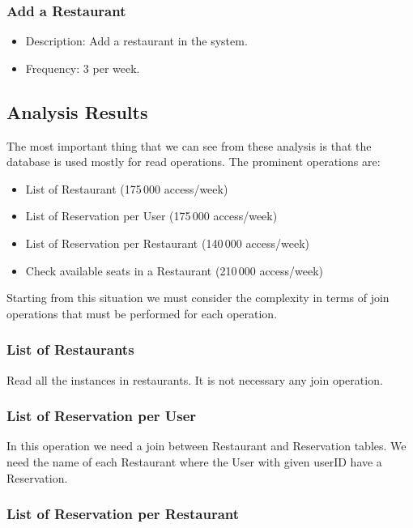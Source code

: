 \subsubsection{Add a Restaurant}

\begin{itemize}
	\item Description: Add a restaurant in the system.
	\item Frequency: \(3\) per week.
\end{itemize}


\subsection{Analysis Results}

The most important thing that we can see from these analysis is that the
database is used mostly for read operations. The prominent operations are:

\begin{itemize}
	\item List of Restaurant (175\,000 access/week)
	\item List of Reservation per User (175\,000 access/week)
	\item List of Reservation per Restaurant (140\,000 access/week)
	\item Check available seats in a Restaurant (210\,000 access/week)
\end{itemize}

Starting from this situation we must consider the complexity in terms of join
operations that must be performed for each operation.

\subsubsection{List of Restaurants}

Read all the instances in restaurants. It is not necessary any join operation.

\subsubsection{List of Reservation per User}

In this operation we need a join between Restaurant and Reservation tables.  We
need the name of each Restaurant where the User with given userID have a
Reservation.

\subsubsection{List of Reservation per Restaurant}

